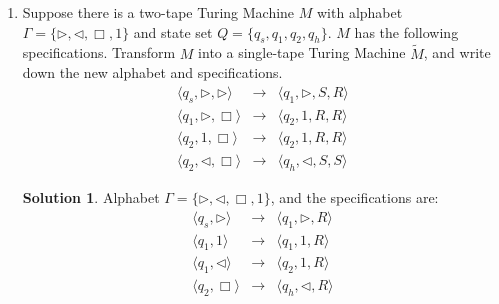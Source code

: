 \documentclass[12pt,a4paper]{article}
\theoremstyle{definition}
\newtheorem*{solution}{Solution}
\numberwithin{equation}{section}
\numberwithin{figure}{section}
\begin{document}
\begin{enumerate}
\begin{proof}
As we can extend the $e$ as the sum of the infinite series. Let $S_k = \sum\limits_{n=0}^{\infty}\dfrac{1}{n!}$, by theory of infinite series, $S_k < e < S_k + \dfrac{1}{k!} $. Since $S_k$ is rational, the decimal expansion of $S_k$ can be effectively
calculated to any desired number of places using long division. Thus the effective method for calculating f(n) (given a number n) can be described as:\\
Find the first $N \le n + 1$ such that the decimal expansion
$S_N = a_0 \cdot a_1 \cdot a_2 \cdot \cdot \cdot a_na_{n+1} \cdot \cdot \cdot a_N \cdot \cdot \cdot $ does not have all of $a_{n+1} · · · a_N$
equal to 9. Then put $f(n) = a_n$. \\
To see that this gives the required value, suppose that $a_m \neq 9$ with
$n < m \le N$. Hence $a_0 \cdot a_1 \cdot \cdot \cdot a_n \cdot \cdot \cdot a_m \cdot \cdot \cdot < e < a_0 \cdot a_1 \cdot \cdot \cdot a_n \cdot \cdot \cdot (a_m + 1) \cdot \cdot \cdot $. So
the $n$-th decimal place of $e$ is indeed $a_n$. \\
Thus by Church's Thesis, $f$ is computable.
\end{proof}

\item Suppose there is a two-tape Turing Machine $M$ with alphabet $\Gamma = \{ \triangleright, \triangleleft, \Box, 1 \}$ and state set $Q = \{ q_s, q_1, q_2, q_h \}$. $M$ has the following specifications. Transform $M$ into a single-tape Turing Machine $\widetilde{M}$, and write down the new alphabet and specifications.
\begin{eqnarray*}
   \langle q_s,\triangleright,\triangleright  \rangle & \rightarrow & \langle q_1, \triangleright, S, R\rangle \\
   \langle q_1,\triangleright,\Box \rangle & \rightarrow & \langle q_2, 1, R, R\rangle \\
   \langle q_2, 1,\Box \rangle & \rightarrow & \langle q_2, 1, R, R\rangle \\
   \langle q_2, \triangleleft,\Box \rangle & \rightarrow & \langle q_h, \triangleleft, S, S\rangle
\end{eqnarray*}
\begin{solution}
  Alphabet $\Gamma = \{ \triangleright, \triangleleft, \Box, 1 \}$, and the specifications are:
\begin{eqnarray*}
   \langle q_s,\triangleright \rangle & \rightarrow & \langle q_1, \triangleright, R\rangle \\
   \langle q_1, 1 \rangle & \rightarrow & \langle q_1, 1, R\rangle \\
   \langle q_1, \triangleleft \rangle & \rightarrow & \langle q_2, 1, R \rangle \\
   \langle q_2, \Box \rangle & \rightarrow & \langle q_h, \triangleleft, R \rangle   
\end{eqnarray*}
\end{solution}


\end{enumerate}
\end{document}
